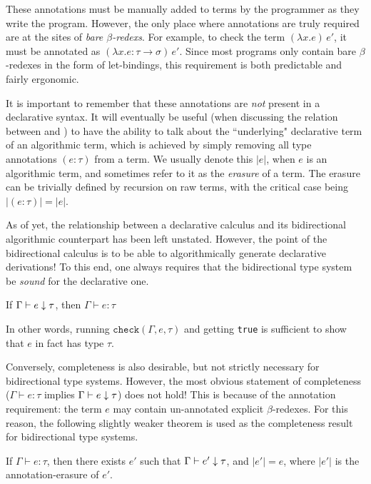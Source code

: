 These annotations must be manually added to terms by the programmer as they write the program. However, the only place where annotations are truly required are at the sites of \textit{bare $\beta$-redexs}. For example, to check the term $(\lambda x. e)\, e'$, it must be annotated as $(\lambda x.e : \tau \to \sigma) \, e'$. Since most programs only contain bare $\beta$-redexes in the form of let-bindings, this requirement is both predictable and fairly ergonomic.

It is important to remember that these annotations are \textit{not} present in a declarative syntax. It will eventually be useful (when discussing the relation between \bilambdaamor and \dlambdaamor) to have the ability to talk about the ``underlying" declarative term of an algorithmic term, which is achieved by simply removing all type annotations $(e : \tau)$ from a term. We usually denote this $|e|$, when $e$ is an algorithmic term, and sometimes refer to it as the \textit{erasure} of a term. The erasure can be trivially defined by recursion on raw terms, with the critical case being $|(e : \tau)| = |e|$.

As of yet, the relationship between a declarative calculus and its bidirectional algorithmic counterpart has been left unstated. However, the point of the bidirectional calculus is to be able to algorithmically generate declarative derivations! To this end, one always requires that the bidirectional type system be \textit{sound} for the declarative one.
\begin{theorem}
If $\Gamma \vdash e \downarrow \tau$, then $\Gamma \vdash e : \tau$
\end{theorem}
In other words, running $\texttt{check}(\Gamma,e,\tau)$ and getting \texttt{true} is sufficient to show that $e$ in fact has type $\tau$.

Conversely, completeness is also desirable, but not strictly necessary for bidirectional type systems. However, the most obvious statement of completeness ($\Gamma \vdash e : \tau$ implies $\Gamma \vdash e \downarrow \tau$) does not hold! This is because of the annotation requirement: the term $e$ may contain un-annotated explicit $\beta$-redexes. For this reason, the following slightly weaker theorem is used as the completeness result for bidirectional type systems.
\begin{theorem}
If $\Gamma \vdash e : \tau$, then there exists $e'$ such that $\Gamma \vdash e' \downarrow \tau$, and $|e'| = e$, where $|e'|$ is the annotation-erasure of $e'$.
\label{thm:bidir-compl-example}
\end{theorem}

